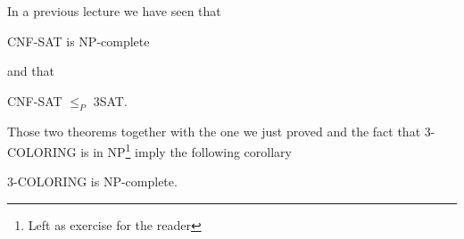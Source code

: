 In a previous lecture we have seen that
\begin{theorem}
	CNF-SAT is NP-complete
\end{theorem}
and that
\begin{theorem}
	CNF-SAT $\le_P$ 3SAT.
\end{theorem}
Those two theorems together with the one we just proved and the fact that
3-COLORING is in NP\footnote{Left as exercise for the reader}
imply the following corollary
\begin{corollary}
	3-COLORING is NP-complete.
\end{corollary}
